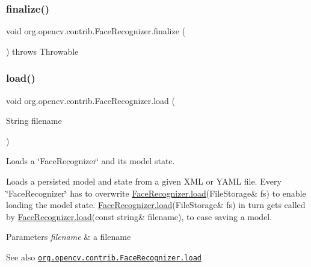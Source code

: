 \subsubsection{\texorpdfstring{finalize()}{finalize()}}
{\footnotesize\ttfamily void org.\+opencv.\+contrib.\+Face\+Recognizer.\+finalize (\begin{DoxyParamCaption}{ }\end{DoxyParamCaption}) throws Throwable\hspace{0.3cm}{\ttfamily [protected]}}

\mbox{\label{classorg_1_1opencv_1_1contrib_1_1_face_recognizer_a3deb06ef030354b7e805eba3eec638f6}} 
\subsubsection{\texorpdfstring{load()}{load()}}
{\footnotesize\ttfamily void org.\+opencv.\+contrib.\+Face\+Recognizer.\+load (\begin{DoxyParamCaption}\item[{String}]{filename }\end{DoxyParamCaption})}

Loads a \char`\"{}\+Face\+Recognizer\char`\"{} and its model state.

Loads a persisted model and state from a given X\+ML or Y\+A\+ML file. Every \char`\"{}\+Face\+Recognizer\char`\"{} has to overwrite {\ttfamily \mbox{\hyperlink{classorg_1_1opencv_1_1contrib_1_1_face_recognizer_a3deb06ef030354b7e805eba3eec638f6}{Face\+Recognizer.\+load}}(File\+Storage\& fs)} to enable loading the model state. {\ttfamily \mbox{\hyperlink{classorg_1_1opencv_1_1contrib_1_1_face_recognizer_a3deb06ef030354b7e805eba3eec638f6}{Face\+Recognizer.\+load}}(File\+Storage\& fs)} in turn gets called by {\ttfamily \mbox{\hyperlink{classorg_1_1opencv_1_1contrib_1_1_face_recognizer_a3deb06ef030354b7e805eba3eec638f6}{Face\+Recognizer.\+load}}(const string\& filename)}, to ease saving a model.


\begin{DoxyParams}{Parameters}
{\em filename} & a filename\\
\hline
\end{DoxyParams}
\begin{DoxySeeAlso}{See also}
\href{http://docs.opencv.org/modules/contrib/doc/facerec_api.html#facerecognizer-load}{\tt org.\+opencv.\+contrib.\+Face\+Recognizer.\+load} 
\end{DoxySeeAlso}
\mbox{\label{classorg_1_1opencv_1_1contrib_1_1_face_recognizer_afed81d21859557ca5680504353d7454e}} 
